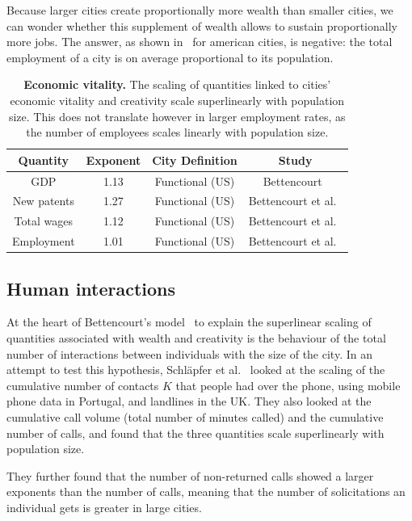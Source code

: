 Because larger cities create proportionally more wealth than smaller cities, we
can wonder whether this supplement of wealth allows to sustain proportionally
more jobs. The answer, as shown in~\cite{Bettencourt:2014} for american cities,
is negative: the total employment of a city is on average proportional to its population.

\begin{table}[!h]
    \centering
\begin{tabular}{|cccc|}
\hline
Quantity & Exponent & City Definition & Study\\
\hline
GDP & 1.13 & Functional (US) & Bettencourt~\cite{Bettencourt:2013}\\
New patents & 1.27 & Functional (US) & Bettencourt et al.~\cite{Bettencourt:2007}\\ 
Total wages & 1.12 & Functional (US) & Bettencourt et al.~\cite{Bettencourt:2007}\\
\hline
Employment & 1.01 & Functional (US) & Bettencourt et
al.~\cite{Bettencourt:2007}\\
\hline
\end{tabular}
\caption{{\bf Economic vitality.} The scaling of quantities linked to cities'
economic vitality and creativity scale superlinearly with population size.
This does not translate however in larger employment rates, as the number of
employees scales linearly with population size.} 
\label{table:wealth} 
\end{table}

\subsection{Human interactions}
\label{sub:human_interactions}

At the heart of Bettencourt's model~\cite{Bettencourt:2013} to explain the
superlinear scaling of quantities associated with wealth and creativity is the
behaviour of the total number of interactions between individuals with the size
of the city. In an attempt to test this hypothesis, Schl\"apfer et
al.~\cite{Schlapfer:2014} looked at the scaling of the cumulative number of
contacts $K$ that people had over the phone, using mobile phone data in
Portugal, and landlines in the UK. They also looked at the cumulative call
volume (total number of minutes called) and the cumulative number of calls, and
found that the three quantities scale superlinearly with population size. 

They further found that the number of non-returned calls showed a larger
exponents than the number of calls, meaning that the number of solicitations an
individual gets is greater in large cities.\\


